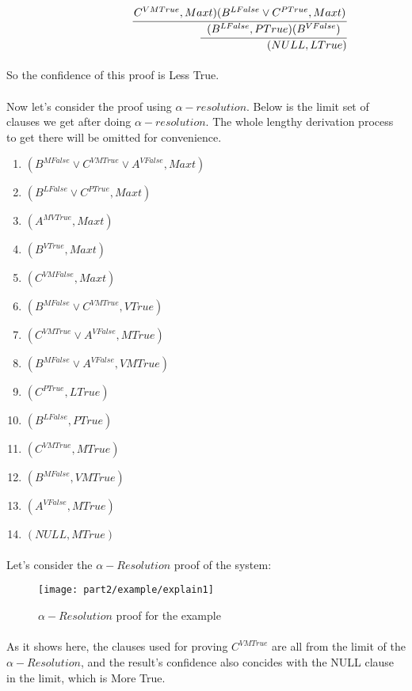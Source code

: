 \documentclass[../gr-final.tex]{subfiles}
\begin{document}
\[\qquad\qquad\qquad\cfrac{ C^{VMTrue},Maxt)  (B^{LFalse} \vee C^{PTrue}, Maxt) }
{\qquad\qquad\qquad\cfrac{ (B^{LFalse}, PTrue) (B^{VFalse} )  }
      {\qquad\qquad\qquad(NULL, LTrue)}}
\]
\paragraph{} So the confidence of this proof is Less True. 
\paragraph{} Now let's consider the proof using
$\alpha-resolution$.
Below is the limit set of clauses we get after doing
$\alpha-resolution$. The whole lengthy derivation process to get
there will be omitted for convenience.
\begin{enumerate}
        \item $(B^{MFalse}  \vee C^{ V M True} \vee A^{ V False}
                ,Maxt)$
        \item $(B^{LFalse} \vee C^{ P True},Maxt)$
        \item $(A^{ M V True},Maxt)$
        \item $(B^{ V True},Maxt)$
        \item $(C^{ V M False},Maxt)$
        \item $(B^{ M False} \vee C^{ V M True},V True)$
        \item $(C^{ V M True} \vee A^{ V False},M True)$
        \item $(B^{ M False} \vee A^{ V False},V M True)$
        \item $(C^{ P True},L True)$
        \item $(B^{ L False},P True)$
        \item $(C^{ V M True},M True)$
        \item $(B^{ M False},V M True)$
        \item $(A^{VFalse},MTrue)$
        \item $(NULL,M True)$
\end{enumerate}
\paragraph{} Let's
consider the $\alpha-Resolution$ proof of the system:
\begin{figure}[H]
  \centering
  \texttt{[image: part2/example/explain1]}
  \caption{$\alpha-Resolution$ proof for the example}
\end{figure}
\paragraph{} As it shows here, the clauses used for proving
$C^{VMTrue}$ are all from the limit of the $\alpha-Resolution$,
and the result's confidence also concides with the NULL clause in the limit, which is
More True. 
\end{document}
